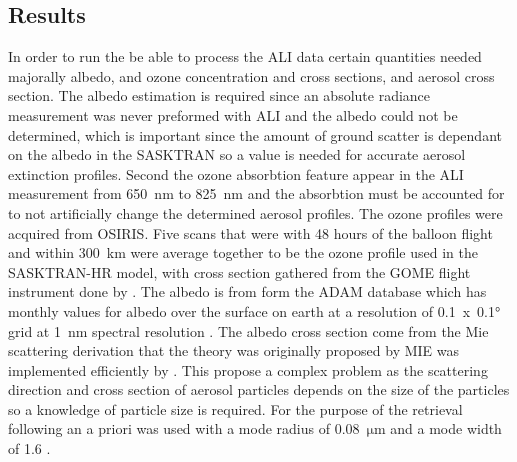 \documentclass[12pt]{article}
\begin{document}
\subsection{Results}

In order to run the be able to process the ALI data certain quantities needed majorally albedo, and ozone concentration and cross sections, and aerosol cross section. The albedo estimation is required since an absolute radiance measurement was never preformed with ALI and the albedo could not be determined, which is important since the amount of ground scatter is dependant on the albedo in the SASKTRAN so a value is needed for accurate aerosol extinction profiles. Second the ozone absorbtion feature appear in the ALI measurement from 650~nm to 825~nm and the absorbtion must be accounted for to not artificially change the determined aerosol profiles. The ozone profiles were acquired from OSIRIS. Five scans that were with 48 hours of the balloon flight and  within 300~km were average together to be the ozone profile used in the SASKTRAN-HR model, with cross section gathered from the GOME flight instrument done by \cite{Burrows1999}. The albedo is from form the ADAM database which has monthly values for albedo over the surface on earth at a resolution of 0.1~x~0.1\si{\degree} grid at 1~nm spectral resolution \citep{Muller2013}. The albedo cross section come from the Mie scattering derivation that the theory was originally proposed by MIE was implemented efficiently by \cite{Wiscombe1980}. This propose a complex problem as the scattering direction and cross section of aerosol particles depends on the size of the particles so a knowledge of particle size is required. For the purpose of the retrieval following an a priori was used with a mode radius of 0.08~$\si{\micro\metre}$  and a mode width of 1.6 \citep{Deshler2003}.
\end{document}

